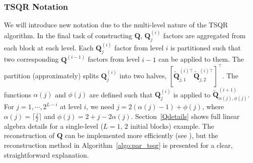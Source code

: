 \documentclass[review,onefignum,onetabnum]{siamart190516}
\newcommand{\R}{\mathbb{R}}
\newcommand{\bb}[1]{\mathbf{#1}}
\begin{document}
%		
%		

		\subsubsection{TSQR Notation}
		We will introduce new notation due to the multi-level nature of the TSQR algorithm.
		In the final task of constructing $\bb{Q}$, $\bb{Q}_j^{(i)}$ factors are aggregated from each block at each level.
		Each $\bb{Q}_j^{(i)}$ factor from level $i$ is partitioned such that two corresponding $\bb{Q}^{(i-1)}$ factors from level $i-1$ can be applied to them. 
		The partition (approximately) splits $\bb{Q}_{j}^{(i)}$ into two halves, $[\tilde{\bb{Q}}_{j, 1}^{(i)\top} \tilde{\bb{Q}}_{j, 2}^{(i)\top}]^{\top}$.
		The functions $\alpha(j)$ and $\phi(j)$ are defined such that $\bb{Q}_j^{(i)}$ is applied to $\tilde{\bb{Q}}_{\alpha(j), \phi(j)}^{(i+1)}$.
		For $j = 1 , \cdots, 2^{L-i}$ at level $i$, we need $j = 2(\alpha(j)-1) + \phi(j)$, where $\alpha(j) = \lceil \frac{j}{2}\rceil$ and $\phi(j) = 2 + j - 2\alpha(j)$.
		Section~\ref{Qdetails} shows full linear algebra details for a single-level ($L=1$, $2$ initial blocks) example.
		The reconstruction of $\bb{Q}$ can be implemented more efficiently (see \cite{BDGJNS2014}), but the reconstruction method in Algorithm~\ref{algo:par_tsqr} is presented for a clear, straightforward explanation.
		
\end{document}
